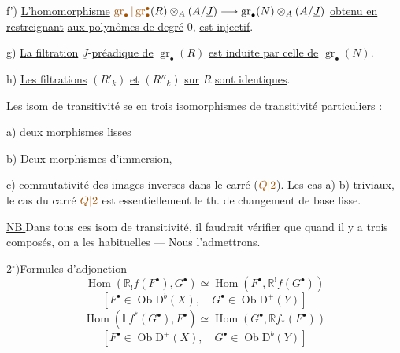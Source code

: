 f') \uline{L'homomorphisme}
$\unsure{\operatorname{gr}_\bullet|\operatorname{gr}^\bullet_\bullet}(R)\otimes_A(A/\underline J)
 \longrightarrow\operatorname{gr}_\bullet(N)\otimes_A(A/\underline J)$
\uline{obtenu en restreignant}
\uline{aux polynômes de degré} $0$, \uline{est injectif}.

g) \uline{La filtration} $\underline J$-\uline{préadique de}
$\operatorname{gr}_\bullet(R)$ \uline{est induite par celle de}
$\operatorname{gr}_\bullet(N)$.

h) \uline{Les filtrations} $(R'_k)$ \uline{et} $(R''_k)$ \uline{sur} $R$ \uline{sont identiques}.

Les isom de transitivité se 
en trois isomorphismes de transitivité
particuliers :

a) deux morphismes lisses

b) Deux morphismes d'immersion,

c) commutativité des images inverses
dans le carré ($\unsure{Q|2}$). Les cas a) b)
triviaux, le cas du carré $\unsure{Q|2}$ est essentiellement
le th. de changement de base lisse.

\uline{NB.}\quad Dans tous ces isom de
transitivité, il faudrait vérifier que
quand il y a trois composés, on a les
 habituelles --- Nous l'admettrons.

2$^\circ$)\quad \uline{Formules d'adjonction}
\[
\boxed{\operatorname{Hom}(\mathbb{R}_!f(F^\bullet),G^\bullet)
 \simeq\operatorname{Hom}(F^\bullet,\mathbb{R}^!f(G^\bullet))}
\]
\[
[F^\bullet\in\operatorname{Ob}\mathrm D^b(X),\quad
 G^\bullet\in\operatorname{Ob}\mathrm D^+(Y)]
\]
\[
\boxed{\operatorname{Hom}(\mathbb{L}f^*(G^\bullet),F^\bullet)
 \simeq\operatorname{Hom}(G^\bullet,\mathbb{R}f_*(F^\bullet))}
\]
\[
[F^\bullet\in\operatorname{Ob}\mathrm D^+(X),\quad
 G^\bullet\in\operatorname{Ob}\mathrm D^b(Y)]
\]

